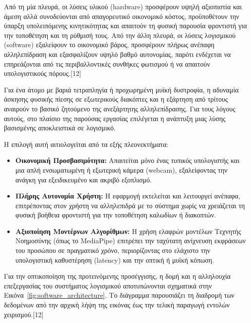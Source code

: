 \documentclass[twoside, a4paper, 11pt]{article}
\begin{document}
Από τη μία πλευρά, οι λύσεις υλικού (hardware) προσφέρουν υψηλή αξιοπιστία και άμεση 
αλλά συνοδεύονται από απαγορευτικό οικονομικό κόστος, προϋποθέτουν την ύπαρξη υπολειπόμενης
κινητικότητας και απαιτούν τη φυσική παρουσία φροντιστή για την τοποθέτηση και τη ρύθμισή τους. Από
την άλλη πλευρά, οι λύσεις λογισμικού (software) εξαλείφουν το οικονομικό βάρος, προσφέρουν πλήρως
ανέπαφη αλληλεπίδραση και εξασφαλίζουν υψηλό βαθμό αυτονομίας, παρότι ενδέχεται να επηρεάζονται
από τις περιβαλλοντικές συνθήκες φωτισμού ή να απαιτούν υπολογιστικούς πόρους.[12]

Για ένα άτομο με βαριά τετραπληγία ή προχωρημένη μυϊκή δυστροφία, η αδυναμία άσκησης φυσικής
πίεσης σε εξωτερικούς διακόπτες και η εξάρτηση από τρίτους αναιρούν το βασικό ζητούμενο της ανεξάρτητης αλληλεπίδρασης. Για τους λόγους αυτούς, στο πλαίσιο της παρούσας εργασίας επιλέγεται η
ανάπτυξη μιας λύσης βασισμένης αποκλειστικά σε λογισμικό.

Η επιλογή αυτή αιτιολογείται από τα εξής πλεονεκτήματα:
\begin{itemize}
    \item \textbf{Οικονομική Προσβασιμότητα:} Απαιτείται μόνο ένας τυπικός υπολογιστής και μια απλή ενσωματωμένη ή εξωτερική κάμερα (webcam), εξαλείφοντας την ανάγκη για εξειδικευμένο και ακριβό εξοπλισμό.
    \item \textbf{Πλήρης Αυτονομία Χρήστη:} Η εφαρμογή εκτελείται και λειτουργεί ανέπαφα, επιτρέποντας στον χρήστη να αλληλεπιδρά με το σύστημα χωρίς να χρειάζεται τη φυσική βοήθεια φροντιστή για την τοποθέτηση καλωδίων ή διακοπτών.
    \item \textbf{Αξιοποίηση Μοντέρνων Αλγορίθμων:} Η χρήση ελαφρών μοντέλων Τεχνητής Νοημοσύνης (όπως το MediaPipe) επιτρέπει την ταχύτατη ανίχνευση εκφράσεων του προσώπου σε πραγματικό χρόνο, περιορίζοντας στο ελάχιστο την υπολογιστική καθυστέρηση (latency) και την οπτική ή μυϊκή κόπωση.
\end{itemize}

Για την οπτικοποίηση της προτεινόμενης προσέγγισης, η δομή και η αλληλουχία επεξεργασίας του συστήματος λογισμικού αποτυπώνονται σχηματικά στην Εικόνα~\ref{fig:software_architecture}. Το διάγραμμα παρουσιάζει τη διαδρομή των δεδομένων από την αρχική λήψη της εικόνας έως την τελική παραγωγή εντολών χειρισμού.[12]
\end{document}
